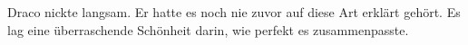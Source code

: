 Draco nickte langsam. Er hatte es noch nie zuvor auf diese Art erklärt gehört. Es lag eine überraschende Schönheit darin, wie perfekt es zusammenpasste.

